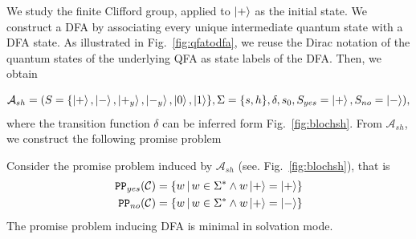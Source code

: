 \documentclass[../main.tex]{subfiles}
\begin{document}
We study the finite Clifford group, applied to $\ket{+}$ as the initial state. We construct a DFA by associating every unique intermediate quantum state with a DFA state. As illustrated in Fig.~\ref{fig:qfatodfa}, we reuse the Dirac notation of the quantum states of the underlying QFA as state labels of the DFA. Then, we obtain

\begin{equation}
    \mathcal{A}_{sh} = (S = \{\ket{+}, \ket{-}, \ket{+_y}, \ket{-_y}, \ket{0}, \ket{1}\}, \Sigma = \{s,h\}, \delta, s_0, S_{yes} = \ket{+}, S_{no} = \ket{-}),
\end{equation} where the transition function $\delta$ can be inferred form Fig.~\ref{fig:blochsh}.
From $\mathcal{A}_{sh}$, we construct the following promise problem

\begin{theorem}
\label{def:sh}
    Consider the promise problem induced by $\mathcal{A}_{sh}$ (see. Fig.~\ref{fig:blochsh}), that is 
    \begin{align}
                \mathtt{PP}_{yes}(\mathcal{C}) &= \{w \, | \, w \in \Sigma^* \land w \ket{+} = \ket{+} \} \\
                \mathtt{PP}_{no}(\mathcal{C}) &= \{w \, | \, w \in \Sigma^* \land w \ket{+} = \ket{-} \}   
    \end{align}
    The promise problem inducing DFA is minimal in solvation mode.
\end{theorem}
\end{document}
